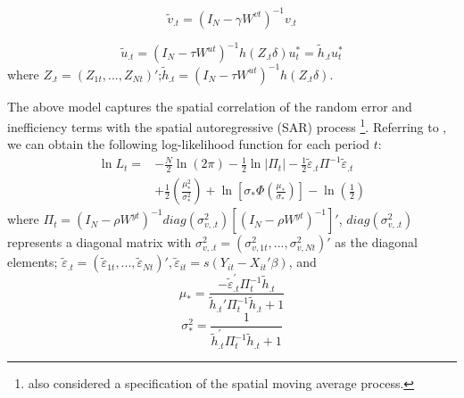  \begin{equation}\label{eq2b}
 	\tilde{v}_{.t} =(I_N-\gamma W^{vt})^{-1}v_{.t} 
 \end{equation}
 
 \begin{equation}\label{eq3b}
 	\tilde{u}_{.t} =(I_N-\tau W^{ut})^{-1}h(Z_{.t}\delta)u_t^* = \tilde{h}_{.t}u_t^*
 \end{equation}
 where $Z_{.t}=(Z_{1t},...,Z_{Nt})'$;$\tilde{h}_{.t}=(I_N-\tau W^{ut})^{-1}h(Z_{.t}\delta)$.
 
 The above model captures the spatial correlation of  the random error and inefficiency terms with the spatial autoregressive (SAR) process \footnote{\cite{orea2019new} also considered a specification of the spatial moving average process.}.  Referring to \cite{wang2010estimating}, we can obtain the following log-likelihood function for each period $t$:
 \begin{equation}\label{eq5}
 	\begin{aligned}
 		\ln L_{t}= & -\frac{N}{2} \ln (2 \pi)-\frac{1}{2} \ln |\Pi_t|-\frac{1}{2} \tilde{\varepsilon}_{.t} \Pi^{-1} \tilde{\varepsilon}_{.t} \\
 		& +\frac{1}{2}\left(\frac{\mu_{*}^{2}}{\sigma_{*}^{2}}\right)+\ln \left[\sigma_{*} \Phi\left(\frac{\mu_{*}}{\sigma_{*}}\right)\right]-\ln \left(\frac{1}{2} \right)
 	\end{aligned}
 \end{equation}
 where $\Pi_t=(I_N-\rho W^{yt})^{-1}diag(\sigma_{v,.t}^2)[(I_N-\rho W^{yt})^{-1}]'$, $diag(\sigma_{v,.t}^2)$ represents a diagonal matrix with $\sigma_{v,.t}^2=(\sigma_{v,1t}^2,...,\sigma_{v,Nt}^2)'$ as the diagonal elements; $ \tilde{\varepsilon}_{.t} = ( \tilde{\varepsilon}_{1t},..., \tilde{\varepsilon}_{Nt})', \tilde{\varepsilon}_{it}=s(Y_{it}-X_{it}' \beta)$, and 
 \begin{equation}
 	\mu_*  =\frac{-\tilde{\varepsilon}_{.t}^{\prime} \Pi_{t}^{-1} \tilde{h}_{.t}}{\tilde{h}_{.t}' \Pi_{t}^{-1} \tilde{h}_{.t}+1}
 \end{equation}
 \begin{equation}
 	\sigma_*^2  =\frac{1}{\tilde{h}_{.t}^{\prime} \Pi_{t}^{-1} \tilde{h}_{.t}+1 }
 \end{equation}
 

